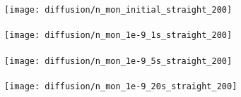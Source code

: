 \begin{figure}[H]
	\begin{center}
		\vspace{-1em}
		\texttt{[image: diffusion/n\_mon\_initial\_straight\_200]} \\
		\vspace{-4em}  \vspace{2em} \\
		\texttt{[image: diffusion/n\_mon\_1e-9\_1s\_straight\_200]} \\
		\vspace{-4em}  \vspace{2em} \\
		\texttt{[image: diffusion/n\_mon\_1e-9\_5s\_straight\_200]} \\
		\vspace{-4em}  \vspace{2em} \\
		\texttt{[image: diffusion/n\_mon\_1e-9\_20s\_straight\_200]} \\

\end{center}
\end{figure}
